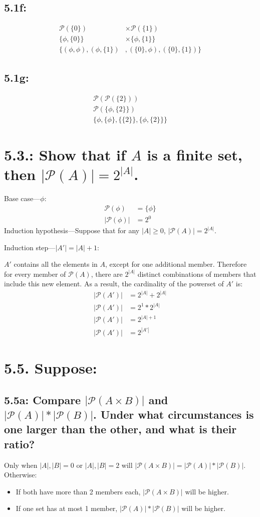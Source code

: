 \documentclass{article}
\begin{document}
\subsection*{5.1f:}
\begin{align*}
  \mathcal{P}(\{0\})&\times\mathcal{P}(\{1\})\\
  \{\phi,\{0\}\}&\times\{\phi,\{1\}\}\\
  \{(\phi,\phi),(\phi,\{1\})&,(\{0\},\phi),(\{0\},\{1\})\}
\end{align*}
\subsection*{5.1g:}
\begin{align*}
  \mathcal{P}(\mathcal{P}(\{2\}))\\
  \mathcal{P}(\{\phi,\{2\}\})\\
  \{\phi,\{\phi\},\{\{2\}\},\{\phi,\{2\}\}\}
\end{align*}
\section*{5.3.: Show that if $A$ is a finite set, then $|\mathcal{P}(A)|=2^{|A|}$.}
Base case---$\phi$:
\begin{align*}
  \mathcal{P}(\phi)&=\{\phi\}\\
  |\mathcal{P}(\phi)|&=2^{0}
\end{align*}
Induction hypothesis---Suppose that for any $|A|\geq0$, $|\mathcal{P}(A)|=2^{|A|}$.

Induction step---$|A'|=|A|+1$:

$A'$ contains all the elements in $A$, except for one additional member. Therefore for every member of $\mathcal{P}(A)$, there are $2^{|A|}$ distinct combinations of members that include this new element. As a result, the cardinality of the powerset of $A'$ is:
\begin{align*}
  |\mathcal{P}(A')|&=2^{|A|}+2^{|A|}\\
  |\mathcal{P}(A')|&=2^1*2^{|A|}\\
  |\mathcal{P}(A')|&=2^{|A|+1}\\
  |\mathcal{P}(A')|&=2^{|A'|}  
\end{align*}
\section*{5.5. Suppose:}
\subsection*{5.5a: Compare $|\mathcal{P}(A\times B)|$ and $|\mathcal{P}(A)|*|\mathcal{P}(B)|$. Under what circumstances is one larger than the other, and what is their ratio?}
Only when $|A|,|B|=0$ or $|A|,|B|=2$ will $|\mathcal{P}(A\times B)|=|\mathcal{P}(A)|*|\mathcal{P}(B)|$. Otherwise:
\begin{itemize}
\item If both have more than 2 members each, $|\mathcal{P}(A\times B)|$ will be higher.
  \item If one set has at most 1 member, $|\mathcal{P}(A)|*|\mathcal{P}(B)|$ will be higher.
  \end{itemize}
\end{document}

